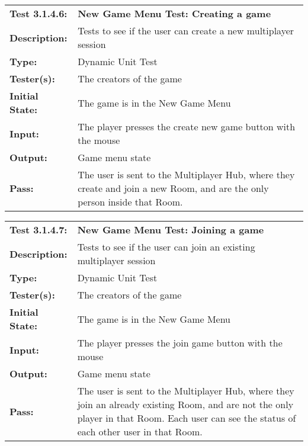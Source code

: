 \documentclass[12pt, titlepage]{article}
\begin{document}
\begin{mdframed}[linewidth=1pt]
\begin{tabularx}{\textwidth}{@{}p{3cm}X@{}}
{\bf Test 3.1.4.6:} & {\bf New Game Menu Test: Creating a game}\\[\baselineskip]
{\bf Description:} & Tests to see if the user can create a new multiplayer session\\[0.5\baselineskip]
{\bf Type:} & Dynamic Unit Test\\[0.5\baselineskip]
{\bf Tester(s):} & The creators of the game\\[0.5\baselineskip]
{\bf Initial State:} & The game is in the New Game Menu\\[0.5\baselineskip]
{\bf Input:} & The player presses the create new game button with the mouse \\[0.5\baselineskip]
{\bf Output:} & Game menu state\\[0.5\baselineskip]
{\bf Pass:} & The user is sent to the Multiplayer Hub, where they create and join a new Room, and are the only person inside that Room.
\end{tabularx}
\end{mdframed}

\begin{mdframed}[linewidth=1pt]
\begin{tabularx}{\textwidth}{@{}p{3cm}X@{}}
{\bf Test 3.1.4.7:} & {\bf New Game Menu Test: Joining a game}\\[\baselineskip]
{\bf Description:} & Tests to see if the user can join an existing multiplayer session\\[0.5\baselineskip]
{\bf Type:} & Dynamic Unit Test\\[0.5\baselineskip]
{\bf Tester(s):} & The creators of the game\\[0.5\baselineskip]
{\bf Initial State:} & The game is in the New Game Menu\\[0.5\baselineskip]
{\bf Input:} & The player presses the join game button with the mouse \\[0.5\baselineskip]
{\bf Output:} & Game menu state\\[0.5\baselineskip]
{\bf Pass:} & The user is sent to the Multiplayer Hub, where they join an already existing Room, and are not the only player in that Room. Each user can see the status of each other user in that Room.
\end{tabularx}
\end{mdframed}
\end{document}
